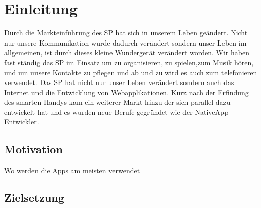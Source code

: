 \chapter{Einleitung}\label{chap:Einleitung}
\thispagestyle{standard}
\pagestyle{standard}
\renewcommand{\footrulewidth}{0.4pt}

Durch die Markteinführung des \acl{SP} hat sich in unserem Leben geändert. Nicht nur unsere Kommunikation wurde dadurch verändert sondern unser Leben im allgemeinen, ist durch dieses kleine Wundergerät verändert worden.
Wir haben fast ständig das \acs{SP} im Einsatz um zu organisieren, zu spielen,zum Musik hören, und um unsere Kontakte zu pflegen und ab und zu wird es auch zum telefonieren verwendet.
Das \acl{SP} hat nicht nur unser Leben verändert sondern auch das Internet und die Entwicklung von Webapplikationen. Kurz nach der Erfindung des smarten Handys kam ein weiterer Markt hinzu der sich parallel dazu entwickelt hat und es wurden neue Berufe gegründet wie der NativeApp Entwickler.



\section{Motivation} \label{sub:Motivation}
Wo werden die Apps am meisten verwendet




\newpage
\section{Zielsetzung}\label{sub:Zielsetzung}










